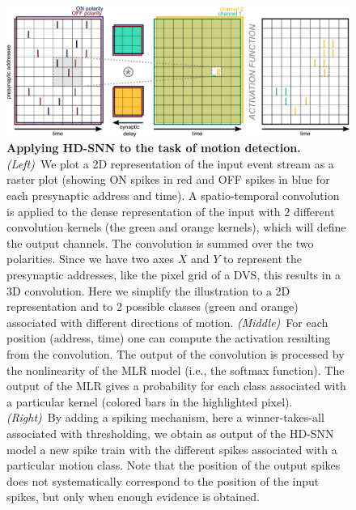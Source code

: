 \documentclass[default]{sn-jnl}%
\theoremstyle{thmstyleone}%
\theoremstyle{thmstyletwo}%
\theoremstyle{thmstylethree}%
\begin{document}
\begin{figure}%
    \centering
    \includegraphics[width=\linewidth]{figures/HDSNN_conv.pdf}
    \caption{
        \textbf{Applying HD-SNN to the task of motion detection.} \textit{(Left)}~We plot a 2D representation of the input event stream as a raster plot (showing ON spikes in red and OFF spikes in blue for each presynaptic address and time). A spatio-temporal convolution is applied to the dense representation of the input with $2$ different convolution kernels (the green and orange kernels), which will define the output channels. The convolution is summed over the two polarities. Since we have two axes $X$ and $Y$ to represent the presynaptic addresses, like the pixel grid of a DVS, this results in a 3D convolution. Here we simplify the illustration to a 2D representation and to 2 possible classes (green and orange) associated with different directions of motion. \textit{(Middle)}~For each position (address, time) one can compute the activation resulting from the convolution. The output of the convolution is processed by the nonlinearity of the MLR model (i.e., the softmax function). The output of the MLR gives a probability for each class associated with a particular kernel (colored bars in the highlighted pixel). \textit{(Right)}~By adding a spiking mechanism, here a winner-takes-all associated with thresholding, we obtain as output of the HD-SNN model a new spike train with the different spikes associated with a particular motion class. Note that the position of the output spikes does not systematically correspond to the position of the input spikes, but only when enough evidence is obtained.
    }
    \label{fig:model}
\end{figure}
\end{document}
